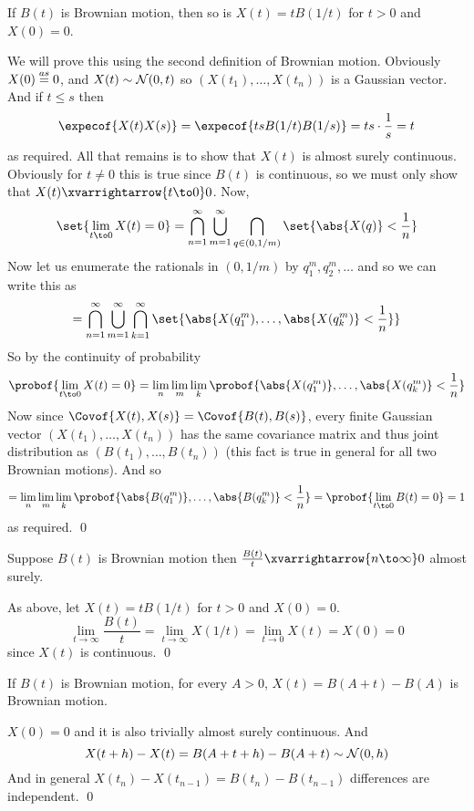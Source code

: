 \bprop[title=Time Inversion Invariance, name=inversioninvariance]

    If $B(t)$ is Brownian motion, then so is $X(t)=tB(1/t)$ for $t>0$ and $X(0)=0$.

\eprop

We will prove this using the second definition of Brownian motion.
Obviously $X(0)\buildrel as\over=0$, and $X(t)\sim{\cal N}(0,t)$ so $(X(t_1),\dots,X(t_n))$ is a Gaussian vector.
And if $t\leq s$ then
$$ \expecof{X(t)X(s)} = \expecof{tsB(1/t)B(1/s)} = ts\cdot\frac1s = t $$
as required.
All that remains is to show that $X(t)$ is almost surely continuous.
Obviously for $t\neq0$ this is true since $B(t)$ is continuous, so we must only show that $X(t)\xvarrightarrow{t\to0}0$.
Now,
$$ \set{\lim_{t\to0}X(t)=0} = \bigcap_{n=1}^\infty\bigcup_{m=1}^\infty\bigcap_{q\in(0,1/m)}\set{\abs{X(q)}<\frac1n} $$
Now let us enumerate the rationals in $(0,1/m)$ by $q_1^m,q_2^m,\dots$ and so we can write this as
$$ = \bigcap_{n=1}^\infty\bigcup_{m=1}^\infty\bigcap_{k=1}^\infty\set{\abs{X(q_1^m),\dots,\abs{X(q_k^m)}<\frac1n}} $$
So by the continuity of probability
$$ \probof{\lim_{t\to0}X(t)=0} = \lim_n\lim_m\lim_k\probof{\abs{X(q_1^m)},\dots,\abs{X(q_k^m)}<\frac1n} $$
Now since $\Covof{X(t),X(s)}=\Covof{B(t),B(s)}$, every finite Gaussian vector $(X(t_1),\dots,X(t_n))$ has the same covariance matrix and thus joint distribution as $(B(t_1),\dots,B(t_n))$ (this fact is
true in general for all two Brownian motions).
And so
$$ = \lim_n\lim_m\lim_k\probof{\abs{B(q_1^m)},\dots,\abs{B(q_k^m)}<\frac1n} = \probof{\lim_{t\to0}B(t)=0} = 1 $$
as required.
\qed

\bthrm[title=Law of Large Numbers, name=lln]

    Suppose $B(t)$ is Brownian motion then $\frac{B(t)}t\xvarrightarrow{n\to\infty}0$ almost surely.

\ethrm

As above, let $X(t)=tB(1/t)$ for $t>0$ and $X(0)=0$.
$$ \lim_{t\to\infty}\frac{B(t)}t = \lim_{t\to\infty}X(1/t) = \lim_{t\to0}X(t) = X(0) = 0 $$
since $X(t)$ is continuous.
\qed

\bprop[title=Initialization Invariance, name=initinvar]

    If $B(t)$ is Brownian motion, for every $A>0$, $X(t)=B(A+t)-B(A)$ is Brownian motion.

\eprop

$X(0)=0$ and it is also trivially almost surely continuous.
And
$$ X(t+h) - X(t) = B(A+t+h) - B(A+t) \sim {\cal N}(0,h) $$
And in general $X(t_n)-X(t_{n-1})=B(t_n)-B(t_{n-1})$ differences are independent.
\qed

